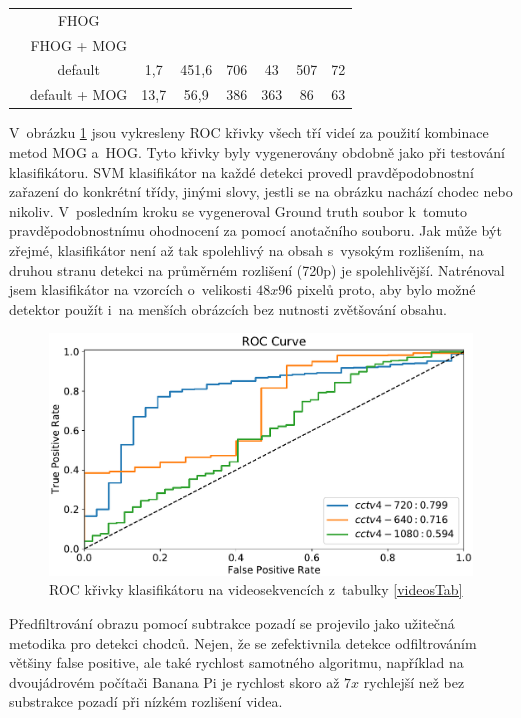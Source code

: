 \begin{table}[H]
\begin{tabular}{|c|c|c|c|c|c|c|c|}
                         & FHOG       		&         &               	  &    	&    &    &          \\ \cline{2-8} 
                         & FHOG + MOG 		&         &                     &    	&    &    &          \\ \cline{2-8} 
                         & default  		& 1,7     & 451,6               & 706   & 43    & 507    & 72          \\ \cline{2-8} 
                         & default + MOG 	& 13,7    &  56,9               & 386   & 363    & 86    & 63          \\ \hline
\end{tabular}
\end{table}

V~obrázku \ref{fig:rocCurve2} jsou vykresleny ROC křivky všech tří videí za použití kombinace metod MOG a~HOG. Tyto křivky byly vygenerovány obdobně jako při testování klasifikátoru. SVM klasifikátor na každé detekci provedl pravděpodobnostní zařazení do konkrétní třídy, jinými slovy, jestli se na obrázku nachází chodec nebo nikoliv. V~posledním kroku se vygeneroval Ground truth soubor k~tomuto pravděpodobnostnímu ohodnocení za pomocí anotačního souboru. Jak může být zřejmé, klasifikátor není až tak spolehlivý na obsah s~vysokým rozlišením, na druhou stranu detekci na průměrném rozlišení (720p) je spolehlivější. Natrénoval jsem klasifikátor na vzorcích o~velikosti $48x96$ pixelů proto, aby bylo možné detektor použít i~na menších obrázcích bez nutnosti zvětšování obsahu.   

\begin{figure}[H]
\centering
\includegraphics[width=16cm]{figures/roc2}
\caption{ROC křivky klasifikátoru na videosekvencích z~tabulky \ref{videosTab}}
\label{fig:rocCurve2}
\end{figure}

Předfiltrování obrazu pomocí subtrakce pozadí se projevilo jako užitečná metodika pro detekci chodců. Nejen, že se zefektivnila detekce odfiltrováním většiny false positive, ale také rychlost samotného algoritmu, například na dvoujádrovém počítači Banana Pi je rychlost skoro až $7x$ rychlejší než bez substrakce pozadí při nízkém rozlišení videa.  

